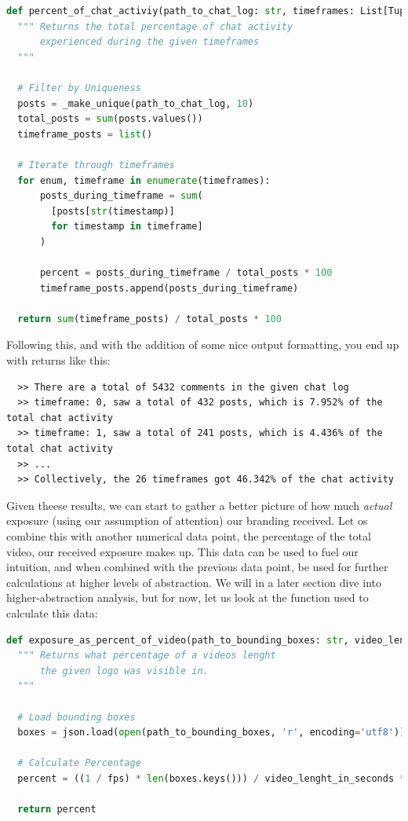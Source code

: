 \documentclass{article}
\begin{document}
\begin{lstlisting}[language=python]
def percent_of_chat_activiy(path_to_chat_log: str, timeframes: List[Tuple[int]]) -> float:
  """ Returns the total percentage of chat activity
      experienced during the given timeframes
  """ 

  # Filter by Uniqueness
  posts = _make_unique(path_to_chat_log, 10)
  total_posts = sum(posts.values())
  timeframe_posts = list()
  
  # Iterate through timeframes
  for enum, timeframe in enumerate(timeframes):
      posts_during_timeframe = sum(
        [posts[str(timestamp)]
        for timestamp in timeframe]
      )
  
      percent = posts_during_timeframe / total_posts * 100
      timeframe_posts.append(posts_during_timeframe)

  return sum(timeframe_posts) / total_posts * 100 
\end{lstlisting}
Following this, and with the addition of some nice output formatting, 
you end up with returns like this:

\begin{verbatim}
  >> There are a total of 5432 comments in the given chat log
  >> timeframe: 0, saw a total of 432 posts, which is 7.952% of the total chat activity
  >> timeframe: 1, saw a total of 241 posts, which is 4.436% of the total chat activity
  >> ...
  >> Collectively, the 26 timeframes got 46.342% of the chat activity
\end{verbatim}

Given theese results, we can start to gather a better picture of how 
much \textit{actual} exposure (using our assumption of attention)
our branding received. Let os combine this with another numerical data point,
the percentage of the total video, our received exposure makes up.
This data can be used to fuel our intuition, and when combined with the
previous data point, be used for further calculations at higher levels of abstraction.
We will in a later section dive into higher-abstraction analysis, but for now, let us look at the
function used to calculate this data:

\begin{lstlisting}[language=python]
def exposure_as_percent_of_video(path_to_bounding_boxes: str, video_lenght_in_seconds: int, fps: int = 60) -> float:
  """ Returns what percentage of a videos lenght
      the given logo was visible in.
  """
  
  # Load bounding boxes
  boxes = json.load(open(path_to_bounding_boxes, 'r', encoding='utf8'))

  # Calculate Percentage
  percent = ((1 / fps) * len(boxes.keys())) / video_lenght_in_seconds * 100

  return percent
\end{lstlisting}
\end{document}
